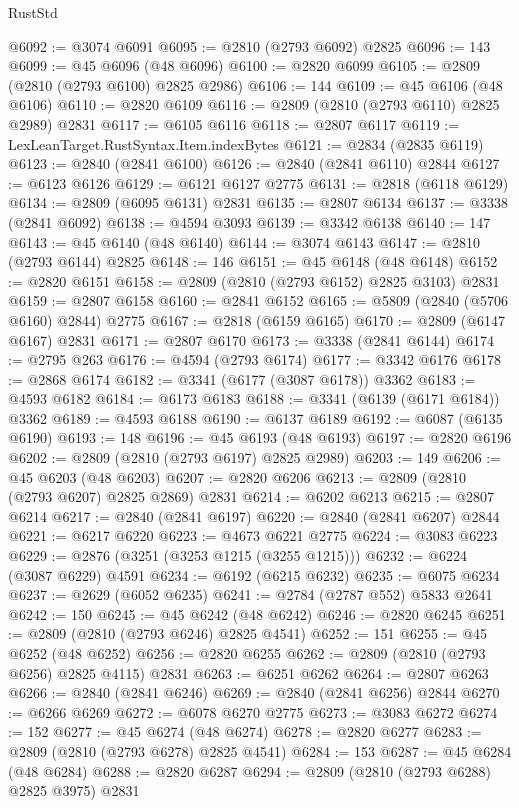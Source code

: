 \begin{lexlean}{RustStd}
\begin{coremodule}
@6092 := @3074 @6091
@6095 := @2810 (@2793 @6092) @2825
@6096 := 143
@6099 := @45 @6096 (@48 @6096)
@6100 := @2820 @6099
@6105 := @2809 (@2810 (@2793 @6100) @2825 @2986)
@6106 := 144
@6109 := @45 @6106 (@48 @6106)
@6110 := @2820 @6109
@6116 := @2809 (@2810 (@2793 @6110) @2825 @2989) @2831
@6117 := @6105 @6116
@6118 := @2807 @6117
@6119 := LexLeanTarget.RustSyntax.Item.indexBytes
@6121 := @2834 (@2835 @6119)
@6123 := @2840 (@2841 @6100)
@6126 := @2840 (@2841 @6110) @2844
@6127 := @6123 @6126
@6129 := @6121 @6127 @2775
@6131 := @2818 (@6118 @6129)
@6134 := @2809 (@6095 @6131) @2831
@6135 := @2807 @6134
@6137 := @3338 (@2841 @6092)
@6138 := @4594 @3093
@6139 := @3342 @6138
@6140 := 147
@6143 := @45 @6140 (@48 @6140)
@6144 := @3074 @6143
@6147 := @2810 (@2793 @6144) @2825
@6148 := 146
@6151 := @45 @6148 (@48 @6148)
@6152 := @2820 @6151
@6158 := @2809 (@2810 (@2793 @6152) @2825 @3103) @2831
@6159 := @2807 @6158
@6160 := @2841 @6152
@6165 := @5809 (@2840 (@5706 @6160) @2844) @2775
@6167 := @2818 (@6159 @6165)
@6170 := @2809 (@6147 @6167) @2831
@6171 := @2807 @6170
@6173 := @3338 (@2841 @6144)
@6174 := @2795 @263
@6176 := @4594 (@2793 @6174)
@6177 := @3342 @6176
@6178 := @2868 @6174
@6182 := @3341 (@6177 (@3087 @6178)) @3362
@6183 := @4593 @6182
@6184 := @6173 @6183
@6188 := @3341 (@6139 (@6171 @6184)) @3362
@6189 := @4593 @6188
@6190 := @6137 @6189
@6192 := @6087 (@6135 @6190)
@6193 := 148
@6196 := @45 @6193 (@48 @6193)
@6197 := @2820 @6196
@6202 := @2809 (@2810 (@2793 @6197) @2825 @2989)
@6203 := 149
@6206 := @45 @6203 (@48 @6203)
@6207 := @2820 @6206
@6213 := @2809 (@2810 (@2793 @6207) @2825 @2869) @2831
@6214 := @6202 @6213
@6215 := @2807 @6214
@6217 := @2840 (@2841 @6197)
@6220 := @2840 (@2841 @6207) @2844
@6221 := @6217 @6220
@6223 := @4673 @6221 @2775
@6224 := @3083 @6223
@6229 := @2876 (@3251 (@3253 @1215 (@3255 @1215)))
@6232 := @6224 (@3087 @6229) @4591
@6234 := @6192 (@6215 @6232)
@6235 := @6075 @6234
@6237 := @2629 (@6052 @6235)
@6241 := @2784 (@2787 @552) @5833 @2641
@6242 := 150
@6245 := @45 @6242 (@48 @6242)
@6246 := @2820 @6245
@6251 := @2809 (@2810 (@2793 @6246) @2825 @4541)
@6252 := 151
@6255 := @45 @6252 (@48 @6252)
@6256 := @2820 @6255
@6262 := @2809 (@2810 (@2793 @6256) @2825 @4115) @2831
@6263 := @6251 @6262
@6264 := @2807 @6263
@6266 := @2840 (@2841 @6246)
@6269 := @2840 (@2841 @6256) @2844
@6270 := @6266 @6269
@6272 := @6078 @6270 @2775
@6273 := @3083 @6272
@6274 := 152
@6277 := @45 @6274 (@48 @6274)
@6278 := @2820 @6277
@6283 := @2809 (@2810 (@2793 @6278) @2825 @4541)
@6284 := 153
@6287 := @45 @6284 (@48 @6284)
@6288 := @2820 @6287
@6294 := @2809 (@2810 (@2793 @6288) @2825 @3975) @2831

\end{coremodule}
\end{lexlean}
